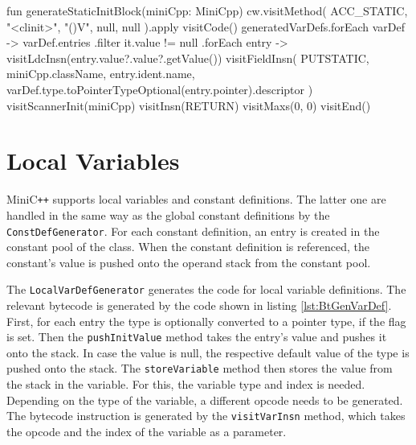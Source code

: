 
\begin{KotlinCode}[float,numbers=none,caption=Code for the initialization of static variables., label=lst:BtGenStatVarInit]
fun generateStaticInitBlock(miniCpp: MiniCpp) {
    cw.visitMethod(
        ACC_STATIC,
        "<clinit>",
        "()V",
        null,
        null
    ).apply {
        visitCode()
        generatedVarDefs.forEach { varDef ->
            varDef.entries
                .filter{ it.value != null }
                .forEach { entry ->
                visitLdcInsn(entry.value?.value?.getValue())
                visitFieldInsn(
                    PUTSTATIC,
                    miniCpp.className,
                    entry.ident.name,
                    varDef.type.toPointerTypeOptional(entry.pointer).descriptor
                )
            }
        }
        visitScannerInit(miniCpp)
        visitInsn(RETURN)
        visitMaxs(0, 0)
        visitEnd()
    }
}
\end{KotlinCode}

\section{Local Variables}

MiniC\verb|++| supports local variables and constant definitions. The latter one are handled in the same way as the global constant definitions by the \verb|ConstDefGenerator|. For each constant definition, an entry is created in the constant pool of the class. When the constant definition is referenced, the constant's value is pushed onto the operand stack from the constant pool.

The \verb|LocalVarDefGenerator| generates the code for local variable definitions. The relevant bytecode is generated by the code shown in listing \ref{lst:BtGenVarDef}. First, for each entry the type is optionally converted to a pointer type, if the flag is set. Then the \verb|pushInitValue| method takes the entry's value and pushes it onto the stack. In case the value is null, the respective default value of the type is pushed onto the stack. The \verb|storeVariable| method then stores the value from the stack in the variable. For this, the variable type and index is needed. Depending on the type of the variable, a different opcode needs to be generated. The bytecode instruction is generated by the \verb|visitVarInsn| method, which takes the opcode and the index of the variable as a parameter. 


